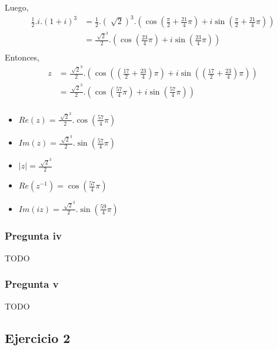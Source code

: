Luego,
\begin{align*}
    \frac{1}{2} . i . (1+i)^3 &= \frac{1}{2}.(\sqrt[]{2})^3.\left(\cos(\frac{\pi}{2} + \frac{21}{4}\pi) +i\sin(\frac{\pi}{2} + \frac{21}{4}\pi)\right) \\
    &= \frac{\sqrt[]{2}^3}{2}.\left(\cos\left(\frac{23}{4}\pi\right) +i\sin\left(\frac{23}{4}\pi\right)\right) \\
\end{align*}
Entonces,
\begin{align*}
    z &= \frac{\sqrt[]{2}^3}{2}.\left(\cos\left((\frac{17}{2} + \frac{23}{4})\pi\right) +i\sin\left((\frac{17}{2} + \frac{23}{4})\pi\right)\right) \\
    &= \frac{\sqrt[]{2}^3}{2}.\left(\cos\left(\frac{57}{4}\pi\right) +i\sin\left(\frac{57}{4}\pi\right)\right) \\
\end{align*}

\begin{itemize}
    \item $ Re(z) = \frac{\sqrt[]{2}^3}{2} . \cos\left(\frac{57}{4}\pi\right) $
    \item $ Im(z) = \frac{\sqrt[]{2}^3}{2} . \sin\left(\frac{57}{4}\pi\right) $
    \item $ |z| = \frac{\sqrt[]{2}^3}{2} $
    \item $ Re(z^{-1}) = \cos\left(\frac{57}{4}\pi\right) $
    \item $ Im(iz) = \frac{\sqrt[]{2}^3}{2} . \sin\left(\frac{59}{4}\pi\right) $
\end{itemize}

\subsubsection{Pregunta iv}
TODO

\subsubsection{Pregunta v}
TODO

\subsection{Ejercicio 2}


